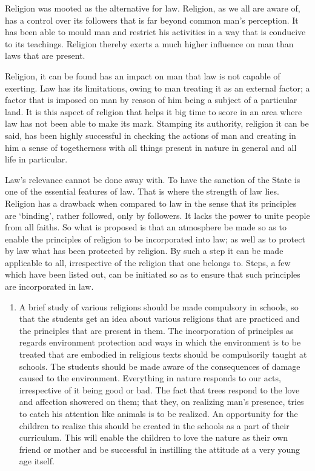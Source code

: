 \begin{multicols}{2}

\noi
Religion was mooted as the alternative for law. Religion, as we all are aware of, has a control
over its followers that is far beyond common man’s perception. It has been able to mould man
and restrict his activities in a way that is conducive to its teachings. Religion thereby exerts a
much higher influence on man than laws that are present.

\noi
Religion, it can be found has an impact on man that law is not capable of exerting. Law has
its limitations, owing to man treating it as an external factor; a factor that is imposed on man
by reason of him being a subject of a particular land. It is this aspect of religion that helps it
big time to score in an area where law has not been able to make its mark. Stamping its
authority, religion it can be said, has been highly successful in checking the actions of man and
creating in him a sense of togetherness with all things present in nature in general and all life
in particular.


Law’s relevance cannot be done away with. To have the sanction of the State is one of the
essential features of law. That is where the strength of law lies. Religion has a drawback when
compared to law in the sense that its principles are ‘binding’, rather followed, only by
followers. It lacks the power to unite people from all faiths. So what is proposed is that an 
atmosphere be made so as to enable the principles of religion to be incorporated into law; as
well as to protect by law what has been protected by religion. By such a step it can be made
applicable to all, irrespective of the religion that one belongs to. Steps, a few which have been
listed out, can be initiated so as to ensure that such principles are incorporated in law.

\begin{enumerate}[label=$\bullet$]
\item A brief study of various religions should be made compulsory in schools, so that the
students get an idea about various religions that are practiced and the principles that are
present in them. The incorporation of principles as regards environment protection and
ways in which the environment is to be treated that are embodied in religious texts
should be compulsorily taught at schools. The students should be made aware of the
consequences of damage caused to the environment. Everything in nature responds to
our acts, irrespective of it being good or bad. The fact that trees respond to the love and
affection showered on them; that they, on realizing man’s presence, tries to catch his
attention like animals is to be realized. An opportunity for the children to realize this
should be created in the schools as a part of their curriculum. This will enable the
children to love the nature as their own friend or mother and be successful in instilling
the attitude at a very young age itself.


\end{enumerate}
\end{multicols}
